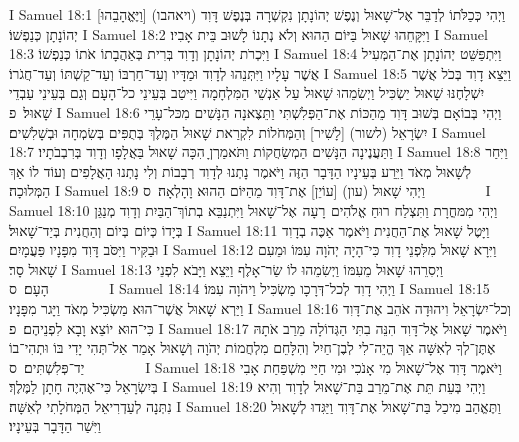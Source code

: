 I Samuel 18:1	וַיְהִי כְּכַלֹּתוֹ לְדַבֵּר אֶל־שָׁאוּל וְנֶפֶשׁ יְהוֹנָתָן נִקְשְׁרָה בְּנֶפֶשׁ דָּוִד (ויאהבו) [וַיֶּאֱהָבֵהוּ] יְהוֹנָתָן כְּנַפְשׁוֹ׃
I Samuel 18:2	וַיִּקָּחֵהוּ שָׁאוּל בַּיּוֹם הַהוּא וְלֹא נְתָנוֹ לָשׁוּב בֵּית אָבִיו׃
I Samuel 18:3	וַיִּכְרֹת יְהוֹנָתָן וְדָוִד בְּרִית בְּאַהֲבָתוֹ אֹתוֹ כְּנַפְשׁוֹ׃
I Samuel 18:4	וַיִּתְפַּשֵּׁט יְהוֹנָתָן אֶת־הַמְּעִיל אֲשֶׁר עָלָיו וַיִּתְּנֵהוּ לְדָוִד וּמַדָּיו וְעַד־חַרְבּוֹ וְעַד־קַשְׁתּוֹ וְעַד־חֲגֹרוֹ׃
I Samuel 18:5	וַיֵּצֵא דָוִד בְּכֹל אֲשֶׁר יִשְׁלָחֶנּוּ שָׁאוּל יַשְׂכִּיל וַיְשִׂמֵהוּ שָׁאוּל עַל אַנְשֵׁי הַמִּלְחָמָה וַיִּיטַב בְּעֵינֵי כל־הָעָם וְגַם בְּעֵינֵי עַבְדֵי שָׁאוּל׃ {פ}
I Samuel 18:6	וַיְהִי בְּבוֹאָם בְּשׁוּב דָּוִד מֵהַכּוֹת אֶת־הַפְּלִשְׁתִּי וַתֵּצֶאנָה הַנָּשִׁים מִכּל־עָרֵי יִשְׂרָאֵל (לשור) [לָשִׁיר] וְהַמְּחֹלוֹת לִקְרַאת שָׁאוּל הַמֶּלֶךְ בְּתֻפִּים בְּשִׂמְחָה וּבְשָׁלִשִׁים׃
I Samuel 18:7	וַתַּעֲנֶינָה הַנָּשִׁים הַמְשַׂחֲקוֹת וַתֹּאמַרְןָ הִכָּה שָׁאוּל בַּאֲלָפָו וְדָוִד בְּרִבְבֹתָיו׃
I Samuel 18:8	וַיִּחַר לְשָׁאוּל מְאֹד וַיֵּרַע בְּעֵינָיו הַדָּבָר הַזֶּה וַיֹּאמֶר נָתְנוּ לְדָוִד רְבָבוֹת וְלִי נָתְנוּ הָאֲלָפִים וְעוֹד לוֹ אַךְ הַמְּלוּכָה׃
I Samuel 18:9	וַיְהִי שָׁאוּל (עון) [עוֹיֵן] אֶת־דָּוִד מֵהַיּוֹם הַהוּא וָהָלְאָה׃ {ס}        
I Samuel 18:10	וַיְהִי מִמּחֳרָת וַתִּצְלַח רוּחַ אֱלֹהִים  רָעָה  אֶל־שָׁאוּל וַיִּתְנַבֵּא בְתוֹךְ־הַבַּיִת וְדָוִד מְנַגֵּן בְּיָדוֹ כְּיוֹם  בְּיוֹם וְהַחֲנִית בְּיַד־שָׁאוּל׃
I Samuel 18:11	וַיָּטֶל שָׁאוּל אֶת־הַחֲנִית וַיֹּאמֶר אַכֶּה בְדָוִד וּבַקִּיר וַיִּסֹּב דָּוִד מִפָּנָיו פַּעֲמָיִם׃
I Samuel 18:12	וַיִּרָא שָׁאוּל מִלִּפְנֵי דָוִד כִּי־הָיָה יְהֹוָה עִמּוֹ וּמֵעִם שָׁאוּל סָר׃
I Samuel 18:13	וַיְסִרֵהוּ שָׁאוּל מֵעִמּוֹ וַיְשִׂמֵהוּ לוֹ שַׂר־אָלֶף וַיֵּצֵא וַיָּבֹא לִפְנֵי הָעָם׃ {ס}        
I Samuel 18:14	וַיְהִי דָוִד לְכל־דְּרָכָו מַשְׂכִּיל וַיהֹוָה עִמּוֹ׃
I Samuel 18:15	וַיַּרְא שָׁאוּל אֲשֶׁר־הוּא מַשְׂכִּיל מְאֹד וַיָּגר מִפָּנָיו׃
I Samuel 18:16	וְכל־יִשְׂרָאֵל וִיהוּדָה אֹהֵב אֶת־דָּוִד כִּי־הוּא יוֹצֵא וָבָא לִפְנֵיהֶם׃ {פ}
I Samuel 18:17	וַיֹּאמֶר שָׁאוּל אֶל־דָּוִד הִנֵּה בִתִּי הַגְּדוֹלָה מֵרַב אֹתָהּ אֶתֶּן־לְךָ לְאִשָּׁה אַךְ הֱיֵה־לִי לְבֶן־חַיִל וְהִלָּחֵם מִלְחֲמוֹת יְהֹוָה וְשָׁאוּל אָמַר אַל־תְּהִי יָדִי בּוֹ וּתְהִי־בוֹ יַד־פְּלִשְׁתִּים׃ {ס}        
I Samuel 18:18	וַיֹּאמֶר דָּוִד אֶל־שָׁאוּל מִי אָנֹכִי וּמִי חַיַּי מִשְׁפַּחַת אָבִי בְּיִשְׂרָאֵל כִּי־אֶהְיֶה חָתָן לַמֶּלֶךְ׃
I Samuel 18:19	וַיְהִי בְּעֵת תֵּת אֶת־מֵרַב בַּת־שָׁאוּל לְדָוִד וְהִיא נִתְּנָה לְעַדְרִיאֵל הַמְּחֹלָתִי לְאִשָּׁה׃
I Samuel 18:20	וַתֶּאֱהַב מִיכַל בַּת־שָׁאוּל אֶת־דָּוִד וַיַּגִּדוּ לְשָׁאוּל וַיִּשַׁר הַדָּבָר בְּעֵינָיו׃
